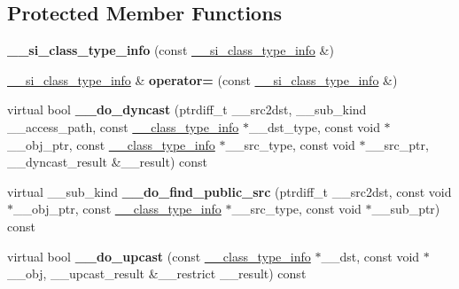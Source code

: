\subsection*{Protected Member Functions}
\begin{DoxyCompactItemize}
\item 
\hypertarget{class____cxxabiv1_1_1____si__class__type__info_a25b7a579d13d2ac055cc197f45b140fa}{{\bfseries \+\_\+\+\_\+si\+\_\+class\+\_\+type\+\_\+info} (const \hyperlink{class____cxxabiv1_1_1____si__class__type__info}{\+\_\+\+\_\+si\+\_\+class\+\_\+type\+\_\+info} \&)}\label{class____cxxabiv1_1_1____si__class__type__info_a25b7a579d13d2ac055cc197f45b140fa}

\item 
\hypertarget{class____cxxabiv1_1_1____si__class__type__info_a30044fcd621ff8c10a8d80cf92b3bd1b}{\hyperlink{class____cxxabiv1_1_1____si__class__type__info}{\+\_\+\+\_\+si\+\_\+class\+\_\+type\+\_\+info} \& {\bfseries operator=} (const \hyperlink{class____cxxabiv1_1_1____si__class__type__info}{\+\_\+\+\_\+si\+\_\+class\+\_\+type\+\_\+info} \&)}\label{class____cxxabiv1_1_1____si__class__type__info_a30044fcd621ff8c10a8d80cf92b3bd1b}

\item 
\hypertarget{class____cxxabiv1_1_1____si__class__type__info_ab593b40488bd2877e87548fe49434110}{virtual bool {\bfseries \+\_\+\+\_\+do\+\_\+dyncast} (ptrdiff\+\_\+t \+\_\+\+\_\+src2dst, \+\_\+\+\_\+sub\+\_\+kind \+\_\+\+\_\+access\+\_\+path, const \hyperlink{class____cxxabiv1_1_1____class__type__info}{\+\_\+\+\_\+class\+\_\+type\+\_\+info} $\ast$\+\_\+\+\_\+dst\+\_\+type, const void $\ast$\+\_\+\+\_\+obj\+\_\+ptr, const \hyperlink{class____cxxabiv1_1_1____class__type__info}{\+\_\+\+\_\+class\+\_\+type\+\_\+info} $\ast$\+\_\+\+\_\+src\+\_\+type, const void $\ast$\+\_\+\+\_\+src\+\_\+ptr, \+\_\+\+\_\+dyncast\+\_\+result \&\+\_\+\+\_\+result) const }\label{class____cxxabiv1_1_1____si__class__type__info_ab593b40488bd2877e87548fe49434110}

\item 
\hypertarget{class____cxxabiv1_1_1____si__class__type__info_a4fa1ea6d858c0d7c18ee91c713a52067}{virtual \+\_\+\+\_\+sub\+\_\+kind {\bfseries \+\_\+\+\_\+do\+\_\+find\+\_\+public\+\_\+src} (ptrdiff\+\_\+t \+\_\+\+\_\+src2dst, const void $\ast$\+\_\+\+\_\+obj\+\_\+ptr, const \hyperlink{class____cxxabiv1_1_1____class__type__info}{\+\_\+\+\_\+class\+\_\+type\+\_\+info} $\ast$\+\_\+\+\_\+src\+\_\+type, const void $\ast$\+\_\+\+\_\+sub\+\_\+ptr) const }\label{class____cxxabiv1_1_1____si__class__type__info_a4fa1ea6d858c0d7c18ee91c713a52067}

\item 
\hypertarget{class____cxxabiv1_1_1____si__class__type__info_abd2b9d1fc19b5dac57a4c3d8e53df623}{virtual bool {\bfseries \+\_\+\+\_\+do\+\_\+upcast} (const \hyperlink{class____cxxabiv1_1_1____class__type__info}{\+\_\+\+\_\+class\+\_\+type\+\_\+info} $\ast$\+\_\+\+\_\+dst, const void $\ast$\+\_\+\+\_\+obj, \+\_\+\+\_\+upcast\+\_\+result \&\+\_\+\+\_\+restrict \+\_\+\+\_\+result) const }\label{class____cxxabiv1_1_1____si__class__type__info_abd2b9d1fc19b5dac57a4c3d8e53df623}

\end{DoxyCompactItemize}
